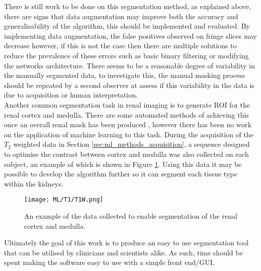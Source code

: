 There is still work to be done on this segmentation method, as explained above, there are signs that data augmentation may improve both the accuracy and generalisability of the algorithm, this should be implemented and evaluated. By implementing data augmentation, the false positives observed on fringe slices may decrease however, if this is not the case then there are multiple solutions to reduce the prevalence of these errors such as basic binary filtering or modifying the networks architecture. There seems to be a reasonable degree of variability in the manually segmented data, to investigate this, the manual masking process should be repeated by a second observer at assess if this variability in the data is due to acquisition or human interpretation.\\

Another common segmentation task in renal imaging is to generate \ac{ROI} for the renal cortex and medulla. There are some automated methods of achieving this once an overall renal mask has been produced \cite{cox_multiparametric_2017}, however there has been no work on the application of machine learning to this task. During the acquisition of the $T_2$ weighted data in Section \ref{sec:ml_methods_acquisition}, a sequence designed to optimise the contrast between cortex and medulla was also collected on each subject, an example of which is shown in Figure \ref{fig:ml_t1}. Using this data it may be possible to develop the algorithm further so it can segment each tissue type within the kidneys.

\begin{figure}[H]
	\centering
	\texttt{[image: ML/T1/T1W.png]}
	\caption{An example of the data collected to enable segmentation of the renal cortex and medulla.}
	\label{fig:ml_t1}
\end{figure}

Ultimately the goal of this work is to produce an easy to use segmentation tool that can be utilised by clinicians and scientists alike. As such, time should be spent making the software easy to use with a simple front end/\ac{GUI}.